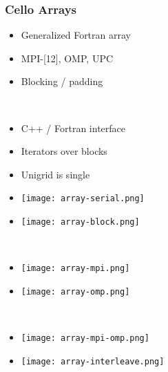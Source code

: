 
\begin{frame}
\frametitle{Cello Arrays}
\begin{minipage}{2.0in}
\begin{itemize}
\item Generalized Fortran array
\item MPI-[12], OMP, UPC
\item Blocking / padding
\end{itemize}
\end{minipage} \ 
\begin{minipage}{2.0in}
\begin{itemize}
\item C++ / Fortran interface
\item Iterators over blocks
\item Unigrid is single 
\end{itemize}
\end{minipage}
\begin{minipage}{1.3in}
\vspace{0.1in}
\begin{itemize}
\item[]\texttt{[image: array-serial.png]} \ \ 
\item[]\texttt{[image: array-block.png]} \ \ \code{ArrayBlock}
\end{itemize}
\end{minipage} \ 
\begin{minipage}{1.3in}
\vspace{0.1in}
\begin{itemize}
\item[]\texttt{[image: array-mpi.png]} \ \ 
\item[]\texttt{[image: array-omp.png]} \ \ 
\end{itemize}
\end{minipage} \ 
\begin{minipage}{1.3in}
\vspace{0.1in}
\begin{itemize}
\item[]\texttt{[image: array-mpi-omp.png]} \ \ 
\item[]\texttt{[image: array-interleave.png]} \ \ 
\end{itemize}
\end{minipage}

\end{frame}
